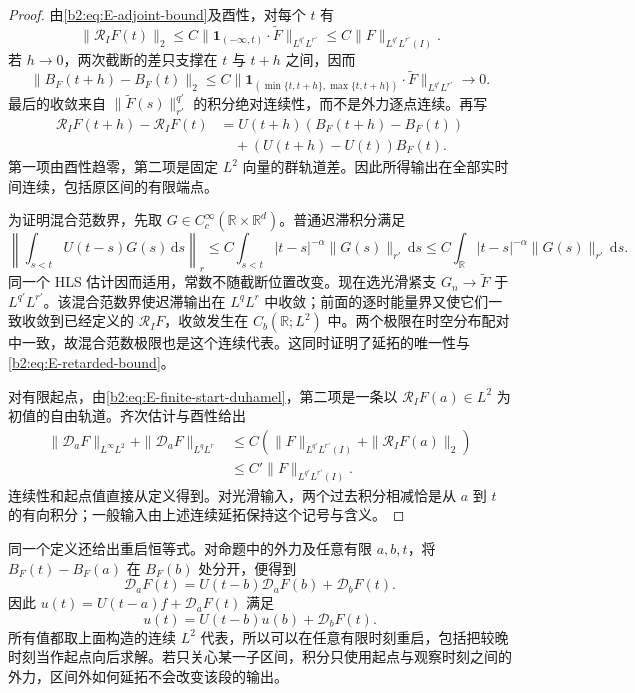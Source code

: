 \begin{proof}
由\eqref{b2:eq:E-adjoint-bound}及酉性，对每个 \(t\) 有
\[
 \|\mathcal R_I F(t)\|_2
 \leq C\|\mathbf1_{(-\infty,t)}\cdot\widetilde F
                         \|_{L^{q'}L^{r'}}
 \leq C\|F\|_{L^{q'}L^{r'}(I)}.
\]
若 \(h\to0\)，两次截断的差只支撑在 \(t\) 与 \(t+h\) 之间，因而
\[
 \|B_F(t+h)-B_F(t)\|_2
 \leq C\|\mathbf1_{(\min\{t,t+h\},\max\{t,t+h\})}
                       \cdot\widetilde F\|_{L^{q'}L^{r'}}
 \longrightarrow0.
\]
最后的收敛来自 \(\|\widetilde F(s)\|_{r'}^{q'}\) 的积分绝对连续性，而不是外力逐点连续。再写
\[
 \begin{aligned}
 \mathcal R_I F(t+h)-\mathcal R_I F(t)
 &=U(t+h)(B_F(t+h)-B_F(t))\\
 &\quad+(U(t+h)-U(t))B_F(t).
 \end{aligned}
\]
第一项由酉性趋零，第二项是固定 \(L^2\) 向量的群轨道差。因此所得输出在全部实时间连续，包括原区间的有限端点。

为证明混合范数界，先取 \(G\in C_c^\infty(\mathbb R\times\mathbb R^d)\)。普通迟滞积分满足
\[
 \left\|\int_{s<t}U(t-s)G(s)\,\mathrm ds\right\|_r
 \leq C\int_{s<t}|t-s|^{-\alpha}\|G(s)\|_{r'}\,\mathrm ds
 \leq C\int_{\mathbb R}|t-s|^{-\alpha}\|G(s)\|_{r'}\,\mathrm ds.
\]
同一个 HLS 估计因而适用，常数不随截断位置改变。现在选光滑紧支 \(G_n\to\widetilde F\) 于 \(L^{q'}L^{r'}\)。该混合范数界使迟滞输出在 \(L^qL^r\) 中收敛；前面的逐时能量界又使它们一致收敛到已经定义的 \(\mathcal R_I F\)，收敛发生在 \(C_b(\mathbb R;L^2)\) 中。两个极限在时空分布配对中一致，故混合范数极限也是这个连续代表。这同时证明了延拓的唯一性与\eqref{b2:eq:E-retarded-bound}。

对有限起点，由\eqref{b2:eq:E-finite-start-duhamel}，第二项是一条以 \(\mathcal R_I F(a)\in L^2\) 为初值的自由轨道。齐次估计与酉性给出
\[
 \begin{aligned}
 \|\mathcal D_aF\|_{L^\infty L^2}
 +\|\mathcal D_aF\|_{L^qL^r}
 &\leq C\left(\|F\|_{L^{q'}L^{r'}(I)}
                       +\|\mathcal R_I F(a)\|_2\right)\\
 &\leq C'\|F\|_{L^{q'}L^{r'}(I)}.
 \end{aligned}
\]
连续性和起点值直接从定义得到。对光滑输入，两个过去积分相减恰是从 \(a\) 到 \(t\) 的有向积分；一般输入由上述连续延拓保持这个记号与含义。
\end{proof}
同一个定义还给出重启恒等式。对命题中的外力及任意有限 \(a,b,t\)，将 \(B_F(t)-B_F(a)\) 在 \(B_F(b)\) 处分开，便得到
\begin{equation}\label{b2:eq:E-duhamel-restart}
 \mathcal D_aF(t)
 =U(t-b)\mathcal D_aF(b)+\mathcal D_bF(t).
\end{equation}
因此 \(u(t)=U(t-a)f+\mathcal D_aF(t)\) 满足
\[
 u(t)=U(t-b)u(b)+\mathcal D_bF(t).
\]
所有值都取上面构造的连续 \(L^2\) 代表，所以可以在任意有限时刻重启，包括把较晚时刻当作起点向后求解。若只关心某一子区间，积分只使用起点与观察时刻之间的外力，区间外如何延拓不会改变该段的输出。


